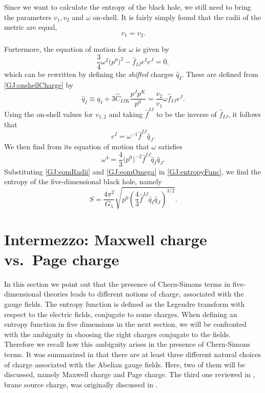 \documentclass[12pt,twoside]{book}
\begin{document}
Since we want to calculate the entropy of the black hole, we still need to bring the parameters $v_{1}, v_{2}$ and $\omega$ on-shell. It is fairly simply found that the radii of the metric are equal,
\begin{equation}\label{GJ:eomRadii}
v_{1} = v_{2}.
\end{equation}

Furtermore, the equation of motion for $\omega$ is given by
\begin{equation}
\frac{3}{4}\omega^{2}  \big( p^{0} \big)^{2} - \hat{f}_{IJ} e^{I} e^{J} = 0,
\end{equation}
which can be rewritten by defining the \emph{shifted} charges $\hat{q}_{I}$. These are defined from \eqref{GJ:onshellCharge} by
\begin{equation}\label{GJ:hattedCharge}
\hat{q}_{I} \equiv q_{I} + 3 \hat{C}_{IJK} \frac{p^{J}p^{K}}{p^{0}} = \frac{v_{2}}{v_{1}}\omega \hat{f}_{IJ}e^{J}.
\end{equation}
Using the on-shell values for $v_{1,2}$ and taking $\hat{f}^{IJ}$ to be the inverse of $\hat{f}_{IJ}$, it follows that
\begin{equation}
e^{I} = \omega^{-1} \hat{f}^{IJ} \hat{q}_{J}.
\end{equation}
We then find from its equation of motion that $\omega$ satisfies
\begin{equation}\label{GJ:eomOmega}
\omega^{4} = \frac{4}{3} \big( p^{0} \big)^{-2} \hat{f}^{IJ} \hat{q}_{I} \hat{q}_{J}.
\end{equation}
Substituting \eqref{GJ:eomRadii} and \eqref{GJ:eomOmega} in \eqref{GJ:entropyFunc}, we find the entropy of the five\hyp{}dimensional black hole, namely
\begin{equation}\label{GJ:entropyBH}
S = \frac{4\pi^{2}}{G_{5}} \sqrt{p^{0}\left( \frac{4}{3} \hat{f}^{IJ} \hat{q}_{I} \hat{q}_{J} \right)^{3/2}}.
\end{equation}


\section{Intermezzo: Maxwell charge vs.\ Page charge}
\label{sec:intermezzoCharges}

In this section we point out that the presence of Chern-Simons terms in five-dimensional theories leads to different notions of charge, associated with the gauge fields. The entropy function is defined as the Legendre transform with respect to the electric fields, conjugate to some charges. When defining an entropy function in five dimensions in the next section, we will be confronted with the ambiguity in choosing the right charges conjugate to the fields. Therefore we recall how this ambiguity arises in the presence of Chern-Simons terms.  It was summarized in \cite{Marolf:2000cb} that there are at least three different natural choices of charge associated with the Abelian gauge fields. Here, two of them will be discussed, namely Maxwell charge and Page charge. The third one reviewed in \cite{Marolf:2000cb}, brane source charge, was originally discussed in \cite{Bachas:fk}. 
\end{document}
